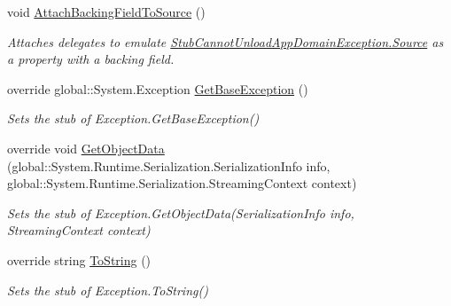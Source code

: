 \begin{DoxyCompactItemize}
void \hyperlink{class_system_1_1_fakes_1_1_stub_cannot_unload_app_domain_exception_ac3b2062ff6386697a8564279aff96e6d}{Attach\-Backing\-Field\-To\-Source} ()
\begin{DoxyCompactList}\small\item\em Attaches delegates to emulate \hyperlink{class_system_1_1_fakes_1_1_stub_cannot_unload_app_domain_exception_a63302ba312f46f1caa8a38bc32900112}{Stub\-Cannot\-Unload\-App\-Domain\-Exception.\-Source} as a property with a backing field.\end{DoxyCompactList}\item 
override global\-::\-System.\-Exception \hyperlink{class_system_1_1_fakes_1_1_stub_cannot_unload_app_domain_exception_a16eff200d6bc2e89d525c8d4bc8c387f}{Get\-Base\-Exception} ()
\begin{DoxyCompactList}\small\item\em Sets the stub of Exception.\-Get\-Base\-Exception()\end{DoxyCompactList}\item 
override void \hyperlink{class_system_1_1_fakes_1_1_stub_cannot_unload_app_domain_exception_ab47aa6e31a062f386ecce82c8c2d8796}{Get\-Object\-Data} (global\-::\-System.\-Runtime.\-Serialization.\-Serialization\-Info info, global\-::\-System.\-Runtime.\-Serialization.\-Streaming\-Context context)
\begin{DoxyCompactList}\small\item\em Sets the stub of Exception.\-Get\-Object\-Data(\-Serialization\-Info info, Streaming\-Context context)\end{DoxyCompactList}\item 
override string \hyperlink{class_system_1_1_fakes_1_1_stub_cannot_unload_app_domain_exception_a5d3471c6bd6e871d02a10628d32fe6af}{To\-String} ()
\begin{DoxyCompactList}\small\item\em Sets the stub of Exception.\-To\-String()\end{DoxyCompactList}\end{DoxyCompactItemize}
